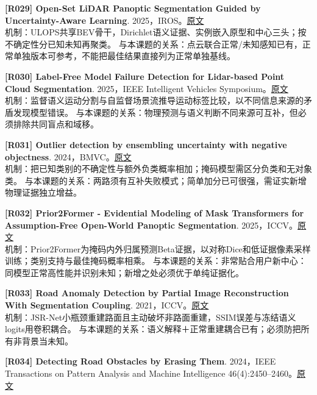 \documentclass[11pt,a4paper]{article}
\begin{document}
\hypertarget{R029}{}\textbf{[R029] Open-Set LiDAR Panoptic Segmentation Guided by Uncertainty-Aware Learning}. 2025，IROS。\href{https://arxiv.org/html/2506.13265}{原文}\\
机制：ULOPS共享BEV骨干，Dirichlet语义证据、实例嵌入原型和中心三头；按不确定性分已知未知再聚类。 与本课题的关系：点云联合正常/未知感知已有，正常单独版本可参考，不能把最佳结果直接列为正常单独基线。\par\medskip
\hypertarget{R030}{}\textbf{[R030] Label-Free Model Failure Detection for Lidar-based Point Cloud Segmentation}. 2025，IEEE Intelligent Vehicles Symposium。\href{https://arxiv.org/html/2407.14306}{原文}\\
机制：监督语义运动分割与自监督场景流推导运动标签比较，以不同信息来源的矛盾发现模型错误。 与本课题的关系：物理预测与语义判断不同来源可互补，但必须排除共同盲点和域移。\par\medskip
\hypertarget{R031}{}\textbf{[R031] Outlier detection by ensembling uncertainty with negative objectness}. 2024，BMVC。\href{https://arxiv.org/pdf/2402.15374}{原文}\\
机制：把已知类别的不确定性与额外负类概率相加；掩码模型需区分负类和无对象类。 与本课题的关系：两路须有互补失败模式；简单加分已可很强，需证实新增物理证据独立增益。\par\medskip
\hypertarget{R032}{}\textbf{[R032] Prior2Former - Evidential Modeling of Mask Transformers for Assumption-Free Open-World Panoptic Segmentation}. 2025，ICCV。\href{https://arxiv.org/html/2504.04841}{原文}\\
机制：Prior2Former为掩码内外归属预测Beta证据，以对称Dice和低证据像素采样训练；类别支持与最佳掩码概率相乘。 与本课题的关系：非常贴合用户新中心：同模型正常高性能并识别未知；新增之处必须优于单纯证据化。\par\medskip
\hypertarget{R033}{}\textbf{[R033] Road Anomaly Detection by Partial Image Reconstruction With Segmentation Coupling}. 2021，ICCV。\href{https://openaccess.thecvf.com/content/ICCV2021/papers/Vojir_Road_Anomaly_Detection_by_Partial_Image_Reconstruction_With_Segmentation_Coupling_ICCV_2021_paper.pdf}{原文}\\
机制：JSR-Net小瓶颈重建路面且主动破坏非路面重建，SSIM误差与冻结语义logits用卷积耦合。 与本课题的关系：语义解释＋正常重建耦合已有；必须防把所有非背景当未知。\par\medskip
\hypertarget{R034}{}\textbf{[R034] Detecting Road Obstacles by Erasing Them}. 2024，IEEE Transactions on Pattern Analysis and Machine Intelligence 46(4):2450–2460。\href{https://arxiv.org/html/2012.13633v3}{原文}\\
\end{document}
